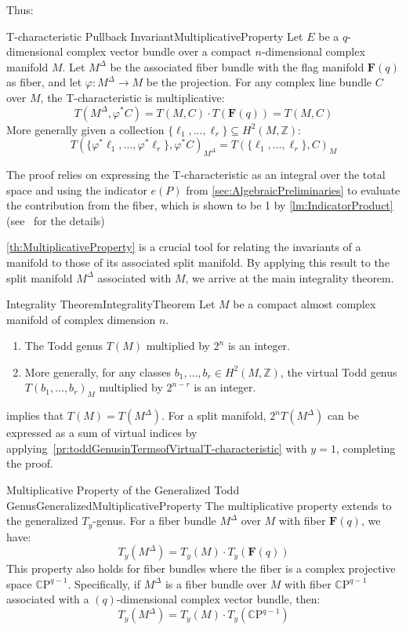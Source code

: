 \documentclass{book}
\newenvironment{Proof}[1][]
  {\begin{ProofTcb}[#1]}
  {\end{ProofTcb}}
\newcommand{\Z}{{\mathbb{Z}}}
\newcommand{\CP}{{\mathbb{C}\mathrm{P}}}
\newcommand{\sse}{\subseteq}
\renewcommand{\phi}{\varphi}
\begin{document}
Thus:
\begin{thm}{T-characteristic Pullback Invariant}{MultiplicativeProperty}
Let $E$ be a $q$-dimensional complex vector bundle over a compact $n$-dimensional complex manifold $M$. Let $M^\Delta$ be the associated fiber bundle with the flag manifold $\mathbf{F}(q)$ as fiber, and let $\phi: M^\Delta \to M$ be the projection. For any complex line bundle $C$ over $M$, the T-characteristic is multiplicative:
\[
T(M^\Delta, \phi^* C) = T(M, C) \cdot T(\mathbf{F}(q)) = T(M, C)
\]
More generally given a collection $\{\ell_1, ..., \ell_r\} \sse H^2(M, \Z)$:
\[
T(\{\phi^*\ell_1, \dots, \phi^*\ell_r\}, \phi^*C)_{M^\Delta} = T(\{\ell_1, \dots, \ell_r\}, C)_M
\]
\end{thm}
\begin{Proof}
The proof relies on expressing the T-characteristic as an integral over the total space and using the
indicator $e(P)$ from \cref{sec:AlgebraicPreliminaries} to evaluate the contribution from the fiber, which is
shown to be 1 by \cref{lm:IndicatorProduct} (see~\cite{hirzebruchTopologicalMethodsAlgebraic1995} for the
details)
\end{Proof}

\cref{th:MultiplicativeProperty} is a crucial tool for relating the invariants of a manifold to those of its associated split manifold. By applying this result to the split manifold $M^\Delta$ associated with $M$, we arrive at the main integrality theorem.

\begin{thm}{Integrality Theorem}{IntegralityTheorem}
Let $M$ be a compact almost complex manifold of complex dimension $n$.
\begin{enumerate}
    \item The Todd genus $T(M)$ multiplied by $2^n$ is an integer.
    \item More generally, for any classes $b_1, \dots, b_r \in H^2(M, \mathbb{Z})$, the virtual Todd genus $T(b_1, \dots, b_r)_M$ multiplied by $2^{n-r}$ is an integer.
\end{enumerate}
\end{thm}
\begin{Proof}
   implies that $T(M) = T(M^\Delta)$. For a split manifold, $2^n T(M^\Delta)$
  can be expressed as a sum of virtual indices by applying~\cref{pr:toddGenusinTermsofVirtualT-characteristic}
  with $y =1$, completing the proof.
\end{Proof}

\begin{thm}{Multiplicative Property of the Generalized Todd Genus}{GeneralizedMultiplicativeProperty}
The multiplicative property extends to the generalized $T_y$-genus. For a fiber bundle $M^\Delta$ over $M$ with fiber $\mathbf{F}(q)$, we have:
\[
T_y(M^\Delta) = T_y(M) \cdot T_y(\mathbf{F}(q))
\]
This property also holds for fiber bundles where the fiber is a complex projective space $\CP^{q-1}$.
Specifically, if $M^\Delta$ is a fiber bundle over $M$ with fiber $\CP^{q-1}$ associated with a
$(q)$-dimensional complex vector bundle, then:
\[
  T_y(M^\Delta) = T_y(M) \cdot T_y(\CP^{q-1})
\]
\end{thm}
\end{document}
